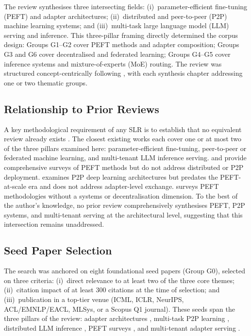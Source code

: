 The review synthesises three intersecting fields: (i)~parameter-efficient fine-tuning
(PEFT) and adapter architectures; (ii)~distributed and peer-to-peer (P2P) machine learning
systems; and (iii)~multi-task large language model (LLM) serving and inference. This
three-pillar framing directly determined the corpus design: Groups G1--G2 cover PEFT
methods and adapter composition; Groups G3 and G6 cover decentralised and federated
learning; Groups G4--G5 cover inference systems and mixture-of-experts (MoE) routing. The
review was structured concept-centrically following \citet{Webster2002}, with each
synthesis chapter addressing one or two thematic groups.

\subsection{Relationship to Prior Reviews}
\label{sec:methodology:prior_reviews}

A key methodological requirement of any SLR is to establish that no equivalent review 
already exists \citep{KitchenhamCharters2007}. The closest existing works each 
cover one or at most two of the three pillars examined here: parameter-efficient fine-tuning, 
peer-to-peer or federated machine learning, and multi-tenant LLM inference serving. 
\citet{Han2024} and \citet{DingNature2023} provide comprehensive surveys of PEFT methods 
but do not address distributed or P2P deployment. \citet{Sajina2021} examines P2P 
deep learning architectures but predates the PEFT-at-scale era and does not address 
adapter-level exchange. \citet{WangAIReview2024} surveys PEFT methodologies without 
a systems or decentralisation dimension. To the best of the author's knowledge, no prior review comprehensively synthesises PEFT, P2P systems, and multi-tenant serving at the architectural level, suggesting that this intersection remains unaddressed.

\subsection{Seed Paper Selection}
\label{sec:methodology:seeds}

The search was anchored on eight foundational seed papers (Group G0), selected on three
criteria: (i)~direct relevance to at least two of the three core themes; (ii)~citation
impact of at least 300 citations at the time of selection; and (iii)~publication in a
top-tier venue (ICML, ICLR, NeurIPS, ACL/EMNLP/EACL, MLSys, or a Scopus Q1 journal).
These seeds span the three pillars of the review: adapter architectures
\citep{Houlsby2019, Hu2022, Pfeiffer2020hub, Pfeiffer2021fusion}, multi-task P2P learning
\citep{Sajina2024}, distributed LLM inference \citep{Borzunov2023}, PEFT surveys
\citep{Han2024}, and multi-tenant adapter serving \citep{Sheng2024}.

